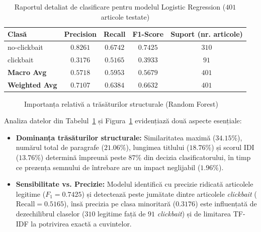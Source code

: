 \documentclass[12pt, a4paper]{article}
\begin{document}
\begin{table}[htbp]
\centering
\caption{Raportul detaliat de clasificare pentru modelul Logistic Regression ($401$ articole testate)}
\label{tab:raport_detaliat}
\renewcommand{\arraystretch}{1.25}
\begin{tabular}{lcccc}
\toprule
\textbf{Clasă} & \textbf{Precision} & \textbf{Recall} & \textbf{F1-Score} & \textbf{Suport (nr. articole)} \\
\midrule
no-clickbait & $0.8261$ & $0.6742$ & $0.7425$ & $310$ \\
clickbait    & $0.3176$ & $0.5165$ & $0.3933$ & $91$ \\
\midrule
\textbf{Macro Avg}    & $0.5718$ & $0.5953$ & $0.5679$ & $401$ \\
\textbf{Weighted Avg} & $0.7107$ & $0.6384$ & $0.6632$ & $401$ \\
\bottomrule
\end{tabular}
\end{table}

\begin{figure}[htbp]
\centering
{}
\caption{Importanța relativă a trăsăturilor structurale (Random Forest)}
\label{fig:importanta_trasaturi}
\end{figure}

Analiza datelor din Tabelul~\ref{tab:raport_detaliat} și Figura~\ref{fig:importanta_trasaturi} evidențiază două aspecte esențiale:
\begin{itemize}
    \item \textbf{Dominanța trăsăturilor structurale:} Similaritatea maximă ($34.15\%$), numărul total de paragrafe ($21.06\%$), lungimea titlului ($18.76\%$) și scorul IDI ($13.76\%$) determină împreună peste $87\%$ din decizia clasificatorului, în timp ce prezența semnului de întrebare are un impact neglijabil ($1.96\%$).
    \item \textbf{Sensibilitate vs. Precizie:} Modelul identifică cu precizie ridicată articolele legitime ($F_1 = 0.7425$) și detectează peste jumătate dintre articolele \textit{clickbait} ($\text{Recall} = 0.5165$), însă precizia pe clasa minoritară ($0.3176$) este influențată de dezechilibrul claselor ($310$ legitime față de $91$ \textit{clickbait}) și de limitarea TF-IDF la potrivirea exactă a cuvintelor.
\end{itemize}
\end{document}
